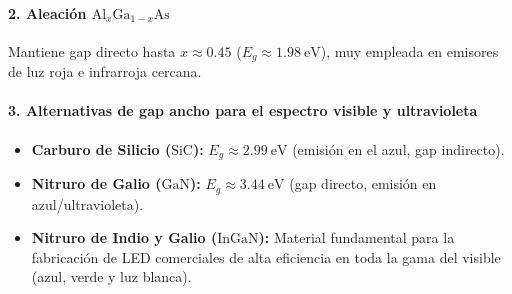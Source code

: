 \paragraph{2. Aleación $\text{Al}_x\text{Ga}_{1-x}\text{As}$}
Mantiene gap directo hasta $x \approx 0.45$ ($E_g \approx \SI{1.98}{\eV}$), muy empleada en emisores de luz roja e infrarroja cercana.

\paragraph{3. Alternativas de gap ancho para el espectro visible y ultravioleta}
\begin{itemize}
    \item \textbf{Carburo de Silicio ($\text{SiC}$):} $E_g \approx \SI{2.99}{\eV}$ (emisión en el azul, gap indirecto).
    \item \textbf{Nitruro de Galio ($\text{GaN}$):} $E_g \approx \SI{3.44}{\eV}$ (gap directo, emisión en azul/ultravioleta).
    \item \textbf{Nitruro de Indio y Galio ($\text{InGaN}$):} Material fundamental para la fabricación de LED comerciales de alta eficiencia en toda la gama del visible (azul, verde y luz blanca).
\end{itemize}


